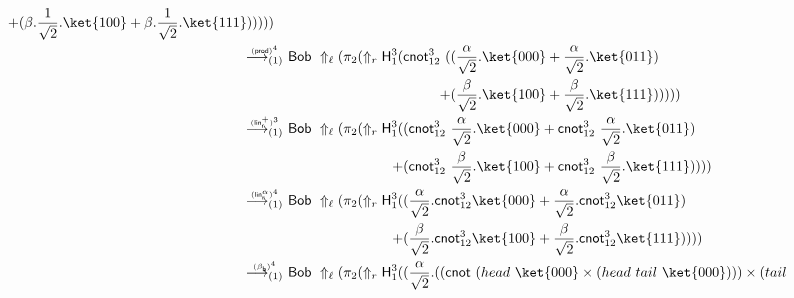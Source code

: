 \documentclass[preprint]{elsarticle}
\newcommand\lra[1][1]{\longrightarrow_{\left(#1\right)}}
\newcommand\pair[2]{({#1}+{#2})}
\newcommand\s[1]{\ensuremath{\mathsf{#1}}}
\newcommand\red[2][1]{\overset{\scriptscriptstyle\smash{#2}\vphantom{x}}{\lra[#1]}\ }
\newcommand\rbetab{(\s{\beta_b})}
\newcommand\rlinr{(\s{lin^+_r})}
\newcommand\rlinscalr{(\s{lin^\alpha_r})}
\newcommand\rprod{(\s{prod})}
\begin{document}
\begin{align*}
\begin{aligned}[t]
                      + & \pair {\beta.\frac 1{\sqrt 2}.\ket{100}} {\beta.\frac
                        1{\sqrt 2}.\ket{111}} ))))
                    \end{aligned}
  \\
  \red{\rprod^4} &
                   \begin{aligned}[t]
                     \s{Bob}\ \Uparrow_\ell(\pi_2(\Uparrow_r \s H_1^3(\s{cnot}_{12}^3\
                     ( & \pair {\frac{\alpha}{\sqrt 2}.\ket{000}}
                     {\frac{\alpha}{\sqrt 2}.\ket{011}}
                     \\
                     + & \pair {\frac{\beta}{\sqrt 2}.\ket{100}}
                     {\frac{\beta}{\sqrt 2}.\ket{111}} ))))
                   \end{aligned}
  \\
  \red{\rlinr^3} &
                   \begin{aligned}[t]
                     \s{Bob}\ \Uparrow_\ell(\pi_2(\Uparrow_r \s H_1^3 ( & \pair
                     {\s{cnot}_{12}^3\ \frac{\alpha}{\sqrt 2}.\ket{000}}
                     {\s{cnot}_{12}^3\ \frac{\alpha}{\sqrt 2}.\ket{011}}
                     \\
                     + & \pair {\s{cnot}_{12}^3\ \frac{\beta}{\sqrt
                         2}.\ket{100}} {\s{cnot}_{12}^3\ \frac{\beta}{\sqrt
                         2}.\ket{111}} )))
                   \end{aligned}
  \\
  \red{\rlinscalr^4} &
                       \begin{aligned}[t]
                         \s{Bob}\ \Uparrow_\ell(\pi_2(\Uparrow_r \s H_1^3 ( & \pair
                         {\frac{\alpha}{\sqrt 2}.\s{cnot}_{12}^3\ket{000}}
                         {\frac{\alpha}{\sqrt 2}.\s{cnot}_{12}^3\ket{011}}
                         \\
                         + & \pair {\frac{\beta}{\sqrt
                             2}.\s{cnot}_{12}^3\ket{100}} {\frac{\beta}{\sqrt
                             2}.\s{cnot}_{12}^3\ket{111}} )))
                       \end{aligned}
  \\
  \red{\rbetab^4} &
                    \begin{aligned}[t]
                      \s{Bob}\ \Uparrow_\ell(\pi_2(\Uparrow_r \s H_1^3 ( ( & {
                        \frac{\alpha}{\sqrt 2}. ((\s{cnot}\ (head\
                        \ket{000}\times(head\ tail\ \ket{000})))\times(tail\
}
\end{aligned}
\end{align*}
\end{document}

